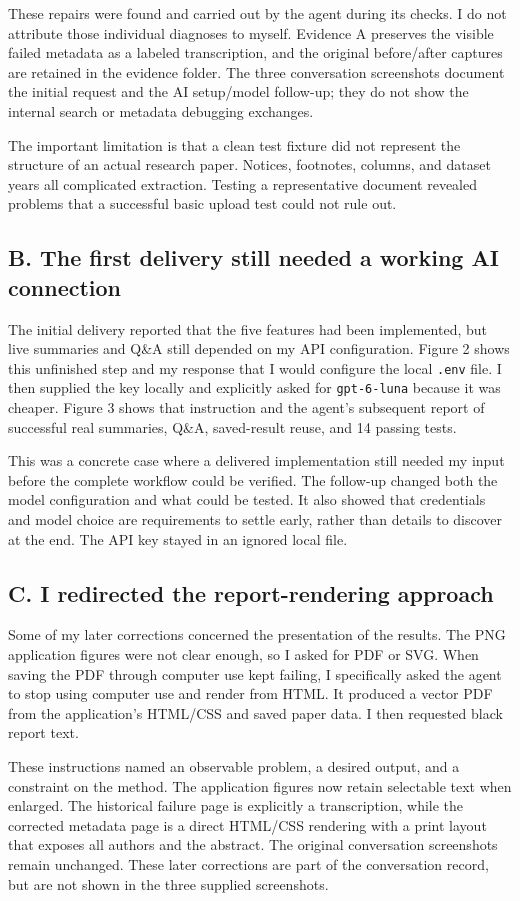 \documentclass[10pt,letterpaper]{article}
\newcommand{\reportsubsection}[1]{\subsection*{\color{black}#1}}
\begin{document}
These repairs were found and carried out by the agent during its checks. I do not attribute those individual diagnoses to myself. Evidence A preserves the visible failed metadata as a labeled transcription, and the original before/after captures are retained in the evidence folder. The three conversation screenshots document the initial request and the AI setup/model follow-up; they do not show the internal search or metadata debugging exchanges.

The important limitation is that a clean test fixture did not represent the structure of an actual research paper. Notices, footnotes, columns, and dataset years all complicated extraction. Testing a representative document revealed problems that a successful basic upload test could not rule out.

\reportsubsection{B. The first delivery still needed a working AI connection}

The initial delivery reported that the five features had been implemented, but live summaries and Q\&A still depended on my API configuration. Figure 2 shows this unfinished step and my response that I would configure the local \texttt{.env} file. I then supplied the key locally and explicitly asked for \texttt{gpt-6-luna} because it was cheaper. Figure 3 shows that instruction and the agent's subsequent report of successful real summaries, Q\&A, saved-result reuse, and 14 passing tests.

This was a concrete case where a delivered implementation still needed my input before the complete workflow could be verified. The follow-up changed both the model configuration and what could be tested. It also showed that credentials and model choice are requirements to settle early, rather than details to discover at the end. The API key stayed in an ignored local file.

\reportsubsection{C. I redirected the report-rendering approach}

Some of my later corrections concerned the presentation of the results. The PNG application figures were not clear enough, so I asked for PDF or SVG. When saving the PDF through computer use kept failing, I specifically asked the agent to stop using computer use and render from HTML. It produced a vector PDF from the application's HTML/CSS and saved paper data. I then requested black report text.

These instructions named an observable problem, a desired output, and a constraint on the method. The application figures now retain selectable text when enlarged. The historical failure page is explicitly a transcription, while the corrected metadata page is a direct HTML/CSS rendering with a print layout that exposes all authors and the abstract. The original conversation screenshots remain unchanged. These later corrections are part of the conversation record, but are not shown in the three supplied screenshots.
\end{document}
